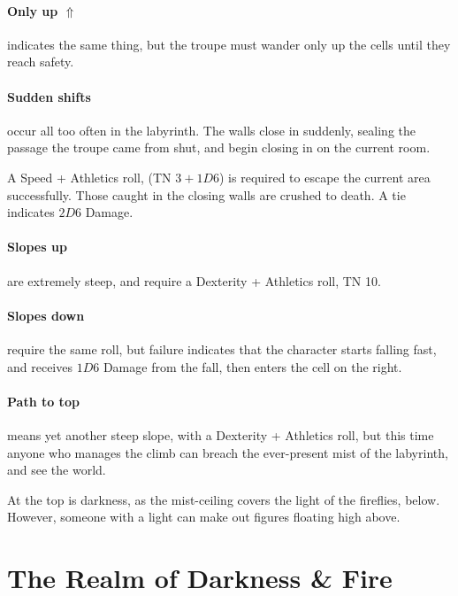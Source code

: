\begin{multicols}{2}
\paragraph{Only up $\Uparrow$}
indicates the same thing, but the troupe must wander only up the cells until they reach safety.

\paragraph{Sudden shifts}
occur all too often in the labyrinth.
The walls close in suddenly, sealing the passage the troupe came from shut, and begin closing in on the current room.

A Speed + Athletics roll, (TN $3 + 1D6$)
is required to escape the current area successfully.
Those caught in the closing walls are crushed to death.
A tie indicates $2D6$ Damage.

\paragraph{Slopes up}
are extremely steep, and require a Dexterity + Athletics roll, TN 10.

\paragraph{Slopes down}
require the same roll, but failure indicates that the character starts falling fast, and receives $1D6$ Damage from the fall, then enters the cell on the right.

\paragraph{Path to top}
means yet another steep slope, with a Dexterity + Athletics roll, but this time anyone who manages the climb can breach the ever-present mist of the labyrinth, and see the world.

At the top is darkness, as the mist-ceiling covers the light of the fireflies, below.
However, someone with a light can make out figures floating high above.

\end{multicols}

\section[Realm of Darkness \& Fire]{The Realm of Darkness \& Fire}
\label{darknessandfire}

